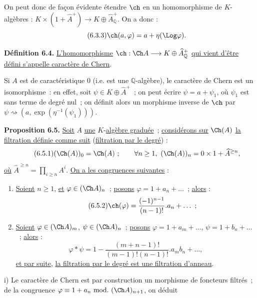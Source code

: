 

On
peut donc de façon évidente étendre \(\ch\) en un homomorphisme de \(K\)-algèbres : \(K\times(1+\widehat A^+)\longrightarrow K\oplus\widehat A_{\mathbb Q}^{+}\). On a donc :
\begin{equation}\tag{6.3.3}
  \ch(a,\varphi)=a+\eta(\Log\varphi).
\end{equation}

\textbf{Définition 6.4.} \uline{L'homomorphisme} \(\ch:\Ch A\longrightarrow K\oplus\widehat A_{\mathbb Q}^{+}\) \uline{qui vient d'être} \uline{défini s'appelle caractère de Chern}.

Si \(A\) est de caractéristique \(0\) (i.e. est une \(\mathbb Q\)-algèbre), le caractère de Chern est un isomorphisme~: en effet, soit \(\psi\in K\oplus\widehat A^+\)~; on peut écrire \(\psi=a+\psi_1\), où \(\psi_1\) est sans terme de degré nul~; on définit alors un morphisme inverse de \(\ch\) par \(\psi\rightsquigarrow(a,\exp(\eta^{-1}(\psi_1)))\).

\textbf{Proposition 6.5.} \uline{Soit} \(A\) \uline{une} \(K\)-\uline{algèbre graduée}~; \uline{considérons sur} \(\Ch(A)\) \uline{la filtration définie comme suit} (\uline{filtration par le degré}) :
\begin{equation}\tag{6.5.1}
  (\Ch(A))_0=\Ch(A)~;\qquad
  \forall n\ge1,\ (\Ch(A))_n=0\times 1+\widehat A^{\ge n},
\end{equation}
\uline{où} \(\widehat A^{\ge n}=\prod_{i\ge n}A^i\). \uline{On a les congruences suivantes} :

\begin{enumerate}[label=\roman*)]
\item \uline{Soient} \(n\ge1\), \uline{et} \(\varphi\in(\Ch A)_n\)~; \uline{posons} \(\varphi=1+a_n+\ldots\)~; \uline{alors} :
\begin{equation}\tag{6.5.2}
  \ch(\varphi)=\frac{(-1)^{n-1}}{(n-1)!}.a_n+\ldots~;
\end{equation}

\item \uline{Soient} \(\varphi\in(\Ch A)_m\), \(\psi\in(\Ch A)_n\)~; \uline{posons}
\(\varphi=1+a_m+\ldots\), \(\psi=1+b_n+\ldots\)~; \uline{alors} :
\begin{equation}\tag{6.5.3}
  \varphi*\psi
  =
  1-\frac{(m+n-1)!}{(m-1)!(n-1)!}.a_m b_n+\ldots,
\end{equation}
\uline{et par suite}, \uline{la filtration par le degré est une filtration d'anneau}.
\end{enumerate}

i) Le caractère de Chern est par construction un morphisme de foncteurs filtrés~; de la congruence \(\varphi\equiv1+a_n\ \mathrm{mod.}\ (\Ch A)_{n+1}\), on déduit
